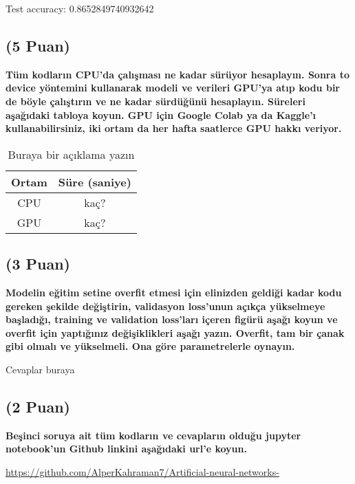 \documentclass[11pt]{article}
\begin{document}
Test accuracy: 0.8652849740932642

\newpage
\subsection{(5 Puan)} \textbf{Tüm kodların CPU'da çalışması ne kadar sürüyor hesaplayın. Sonra to device yöntemini kullanarak modeli ve verileri GPU'ya atıp kodu bir de böyle çalıştırın ve ne kadar sürdüğünü hesaplayın. Süreleri aşağıdaki tabloya koyun. GPU için Google Colab ya da Kaggle'ı kullanabilirsiniz, iki ortam da her hafta saatlerce GPU hakkı veriyor.}

\begin{table}[ht!]
    \centering
    \caption{Buraya bir açıklama yazın}
    \begin{tabular}{c|c}
        Ortam & Süre (saniye) \\\hline
        CPU & kaç? \\
        GPU & kaç?\\
    \end{tabular}
    \label{tab:my_table}
\end{table}

\subsection{(3 Puan)} \textbf{Modelin eğitim setine overfit etmesi için elinizden geldiği kadar kodu gereken şekilde değiştirin, validasyon loss'unun açıkça yükselmeye başladığı, training ve validation loss'ları içeren figürü aşağı koyun ve overfit için yaptığınız değişiklikleri aşağı yazın. Overfit, tam bir çanak gibi olmalı ve yükselmeli. Ona göre parametrelerle oynayın.}

Cevaplar buraya

\begin{comment}
\begin{figure}[ht!]
    \centering
    \texttt{[image: mypicturehere.png]}
    \caption{Buraya açıklama yazın}
    \label{fig:my_pic}
\end{figure}
\end{comment}

\subsection{(2 Puan)} \textbf{Beşinci soruya ait tüm kodların ve cevapların olduğu jupyter notebook'un Github linkini aşağıdaki url'e koyun.}

\url{https://github.com/AlperKahraman7/Artificial-neural-networks-}
\end{document}
